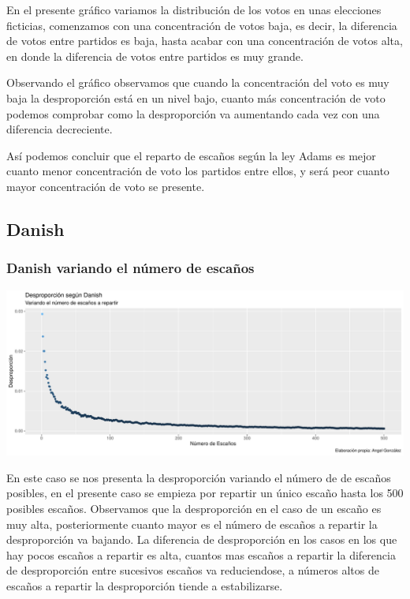 \documentclass[12pt,a4paper,]{book}
\numberwithin{dummy}{section}
\theoremstyle{ocrenumbox}
\theoremstyle{blacknumex}
\theoremstyle{blacknumbox}
\theoremstyle{ocrenum}
\theoremstyle{ocrenum}
\begin{document}
En el presente gráfico variamos la distribución de los votos en unas
elecciones ficticias, comenzamos con una concentración de votos baja, es
decir, la diferencia de votos entre partidos es baja, hasta acabar con
una concentración de votos alta, en donde la diferencia de votos entre
partidos es muy grande.

Observando el gráfico observamos que cuando la concentración del voto es
muy baja la desproporción está en un nivel bajo, cuanto más
concentración de voto podemos comprobar como la desproporción va
aumentando cada vez con una diferencia decreciente.

Así podemos concluir que el reparto de escaños según la ley Adams es
mejor cuanto menor concentración de voto los partidos entre ellos, y
será peor cuanto mayor concentración de voto se presente.

\hypertarget{danish}{%
\subsection{Danish}\label{danish}}

\hypertarget{danish-variando-el-nuxfamero-de-escauxf1os}{%
\subsubsection{Danish variando el número de
escaños}\label{danish-variando-el-nuxfamero-de-escauxf1os}}

\begin{center}\includegraphics[width=0.95\linewidth]{figurasR/unnamed-chunk-39-1} \end{center}

En este caso se nos presenta la desproporción variando el número de de
escaños posibles, en el presente caso se empieza por repartir un único
escaño hasta los 500 posibles escaños. Observamos que la desproporción
en el caso de un escaño es muy alta, posteriormente cuanto mayor es el
número de escaños a repartir la desproporción va bajando. La diferencia
de desproporción en los casos en los que hay pocos escaños a repartir es
alta, cuantos mas escaños a repartir la diferencia de desproporción
entre sucesivos escaños va reduciendose, a números altos de escaños a
repartir la desproporción tiende a estabilizarse.
\end{document}
